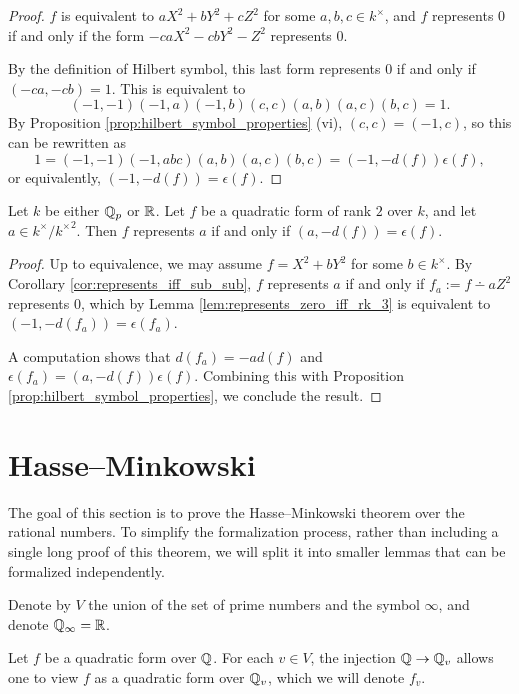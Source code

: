 \begin{proof}
\leanok
$f$ is equivalent to $aX^2 + bY^2 + cZ^2$ for some $a, b, c \in k^\times$, and $f$ represents $0$ if and only if the form $-caX^2 -cbY^2 - Z^2$ represents $0$.

By the definition of Hilbert symbol, this last form represents $0$ if and only if $(-ca, -cb) = 1$.
This is equivalent to
\[ (-1, -1)(-1, a)(-1, b)(c, c)(a, b)(a, c)(b, c) = 1. \]
By Proposition \ref{prop:hilbert_symbol_properties} (vi), $(c, c) = (-1, c)$, so this can be rewritten as
\[ 1 = (-1, -1)(-1, abc)(a, b)(a, c)(b, c) = (-1, -d(f))\epsilon(f), \]
or equivalently, $(-1, -d(f)) = \epsilon(f)$.
\end{proof}

\begin{lemma}\label{lem:represents_iff_rk_2}
\leanok
{}
Let $k$ be either $\mathbb{Q}_p$ or $\mathbb{R}$. Let $f$ be a quadratic form of rank $2$ over $k$, and let $a \in k^\times / {k^\times}^2$. Then $f$ represents $a$ if and only if $(a, -d(f)) = \epsilon(f)$.
\end{lemma}
\begin{proof}
\leanok
Up to equivalence, we may assume $f = X^2 + bY^2$ for some $b \in k^\times$. By Corollary \ref{cor:represents_iff_sub_sub}, $f$ represents $a$ if and only if $f_a := f \dotminus aZ^2$ represents $0$, which by Lemma \ref{lem:represents_zero_iff_rk_3} is equivalent to $(-1, -d(f_a)) = \epsilon(f_a)$.

A computation shows that $d(f_a) = -a d(f)$ and $\epsilon(f_a) = (a, -d(f)) \epsilon (f)$. Combining this with Proposition \ref{prop:hilbert_symbol_properties}, we conclude the result.
\end{proof}

\section{Hasse--Minkowski}\label{sec:Hasse--Minkowski}

The goal of this section is to prove the Hasse--Minkowski theorem over the rational numbers. To simplify the formalization process, rather than including a single long proof of this theorem, we will split it into smaller lemmas that can be formalized independently.

Denote by $V$ the union of the set of prime numbers and the symbol $\infty$, and denote $\mathbb{Q}_\infty = \mathbb{R}$.

Let $f$ be a quadratic form over $\mathbb{Q}$. For each $v \in V$, the injection $\mathbb{Q} \to \mathbb{Q}_v$ allows one to view $f$ as a quadratic form over $\mathbb{Q}_v$, which we will denote $f_v$.

